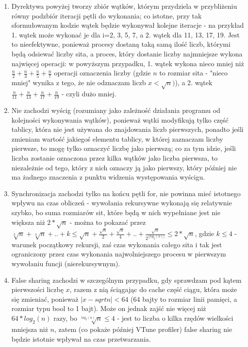 \documentclass[12pt]{article}
\begin{document}
\begin {enumerate}
	\begin{enumerate}
		\item Dyrektywa powyżej tworzy zbiór wątków, którym przydziela w przybliżeniu równy podzbiór iteracji pętli do wykonania; co istotne, przy tak sformułowanym kodzie wątek będzie wykonywał kolejne iteracje - na przykład 1. wątek może wykonać je dla i=2, 3, 5, 7, a 2. wątek dla 11, 13, 17, 19. Jest to nieefektywne, ponieważ procesy dostaną taką samą ilość liczb, którymi będą odsiewać liczby sita, a proces, który dostanie liczby najmniejsze wykona najwięcej operacji: w powyższym przypadku, 1. wątek wykona nieco mniej niż \(\frac{n}{2}+\frac{n}{3}+\frac{n}{5}+\frac{n}{7}\) operacji oznaczenia liczby (gdzie \(n\) to rozmiar sita - "nieco mniej" wynika z tego, że nie odznaczam liczb \(x<\sqrt{n})\)), a 2. wątek \(\frac{n}{11}+\frac{n}{13}+\frac{n}{17}+\frac{n}{19}\) - czyli dużo mniej.
		\item Nie zachodzi wyścig (rozumiany jako zależność działania programu od kolejności wykonywania wątków), ponieważ wątki modyfikują tylko część tablicy, która nie jest używana do znajdowania liczb pierwszych, ponadto jeśli zmieniam wartość jakiegoś elementu tablicy, w której zaznaczam liczby pierwsze, to mogę tylko oznaczyć liczbę jako pierwszą; co za tym idzie, jeśli liczba zostanie oznaczona przez kilka wątków jako liczba pierwsza, to niezależnie od tego, który z nich oznaczy ją jako pierwszy, który później nie ma żadnego znaczenia z punktu widzenia występowania wyścigu.
		\item Synchronizacja zachodzi tylko na końcu pętli for, nie powinna mieć istotnego wpływu na czas obliczeń - wywołania rekursywne wykonają się relatywnie szybko, bo suma rozmiarów sit, które będą w nich wypełniane jest nie większa niż \(2*\sqrt{n}\) - można to pokazać przez \(\sqrt[2]{n}+\sqrt[4]{n}+..+k\le\sqrt{n}+\frac{\sqrt{n}}{2}+\frac{\sqrt{n}}{4}+..+\frac{\sqrt{n}}{2^{\lfloor log_2(n) \rfloor}}\le 2*\sqrt{n}\), gdzie \(k \le 4\) - warunek początkowy rekursji, zaś czas wykonania całego sita i tak jest ograniczony przez czas wykonania najwolniejszego procesu w pierwszym wywołaniu funcji (nierekursywnym).
		\item False sharing zachodzi w szczególnym przypadku, gdy sprawdzam pod kątem pierwszości liczbę \(x\), razem z nią ściągając do cache część ciągu, która może się zmieniać, ponieważ \(|x-sqrt{n}|<64\) (64 bajty to rozmiar linii pamięci, a rozmiar typu bool to 1 bajt). Może on jednak zajść nie więcej niż \(64*log_2(n)\) razy, bo \(\sqrt[log_2(n)]{n}\le 4\) - jest to liczba o kilka rzędów wielkości mniejsza niż \(n\), zatem (co pokaże później VTune profiler) false sharing nie będzie istotnie wpływał na czas przetwarzania.

\end{enumerate}
\end{enumerate}
\end{document}

